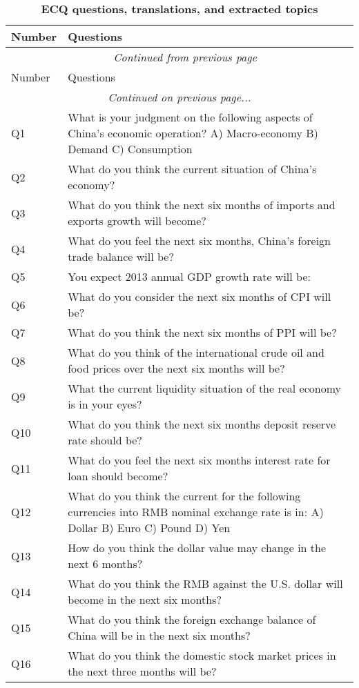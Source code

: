\documentclass[10pt]{article}
\begin{document}
	
	\begin{longtable}{p{1.5cm}p{13.5cm}}
		\caption{\label{ECQtopics}\bf{ECQ questions, translations, and extracted topics}}\\\hline
		Number	&	Questions 	\\\hline
		\endfirsthead
		\multicolumn{2}{c}{\tablename\ \thetable\ \textit{Continued from previous page}} \\\hline
		Number	&	Questions 	\\\hline
		\endhead
		\hline \multicolumn{2}{c}{\textit{Continued on previous page...}} \\
		\endfoot
		\endlastfoot
Q1	&	What is your judgment on the following aspects of China's economic operation? A) Macro-economy B) Demand C) Consumption	\\
Q2	&	What do you think the current situation of China's economy?	\\
Q3	&	What do you think the next six months of imports and exports growth will become?	\\
Q4	&	What do you feel the next six months, China's foreign trade balance will be?	\\
Q5	&	You expect 2013 annual GDP growth rate will be:   	\\
Q6	&	What do you consider the next six months of CPI will be? 	\\
Q7	&	What do you think the next six months of PPI will be?	\\
Q8	&	What do you think of the international crude oil and food prices over the next six months will be?	\\
Q9	&	What the current liquidity situation of the real economy is in your eyes?	\\
Q10	&	What do you think the next six months deposit reserve rate should be?	\\
Q11	&	What do you feel the next six months interest rate for loan should become?	\\
Q12	&	What do you think the current for the following currencies into RMB nominal exchange rate is in: A) Dollar B) Euro C) Pound D) Yen	\\
Q13	&	How do you think the dollar value may change in the next 6 months?	\\
Q14	&	What do you think the RMB against the U.S. dollar will become in the next six months?	\\
Q15	&	What do you think the foreign exchange balance of China will be in the next six months?	\\
Q16	&	What do you think the domestic stock market prices in the next three months will be?	\\

\end{longtable}
\end{document}

